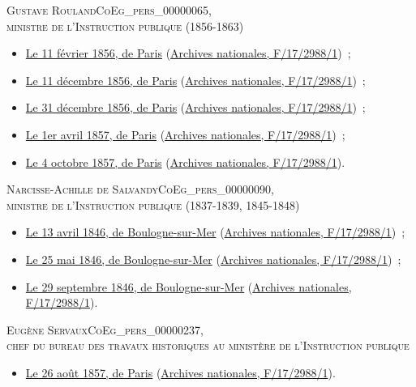 \documentclass{book}
\begin{document}
{\begin{center} \textsc{Gustave Rouland\gls{CoEg_pers_00000065},\\
ministre de l'Instruction publique (1856-1863)}\end{center}
\begin{itemize}
\item \hyperlink{CoEg_Mariette_1856-02-11}{Le 11 février 1856, de Paris} (\hyperlink{CoEg_Mariette_ms_002}{Archives nationales, F/17/2988/1})~;
\item \hyperlink{CoEg_Mariette_1856-12-11}{Le 11 décembre 1856, de Paris} (\hyperlink{CoEg_Mariette_ms_002}{Archives nationales, F/17/2988/1})~;
\item \hyperlink{CoEg_Mariette_1856-12-31}{Le 31 décembre 1856, de Paris} (\hyperlink{CoEg_Mariette_ms_002}{Archives nationales, F/17/2988/1})~;
\item \hyperlink{CoEg_Mariette_1857-04-01}{Le 1er avril 1857, de Paris} (\hyperlink{CoEg_Mariette_ms_002}{Archives nationales, F/17/2988/1})~;
\item \hyperlink{CoEg_Mariette_1857-10-04}{Le 4 octobre 1857, de Paris} (\hyperlink{CoEg_Mariette_ms_002}{Archives nationales, F/17/2988/1}).
\end{itemize}

\begin{center} \textsc{Narcisse-Achille de Salvandy\gls{CoEg_pers_00000090},\\
ministre de l'Instruction publique (1837-1839, 1845-1848)}\end{center}
\begin{itemize}
\item \hyperlink{CoEg_Mariette_1846-04-13}{Le 13 avril 1846, de Boulogne-sur-Mer} (\hyperlink{CoEg_Mariette_ms_002}{Archives nationales, F/17/2988/1})~;
\item \hyperlink{CoEg_Mariette_1846-05-25}{Le 25 mai 1846, de Boulogne-sur-Mer} (\hyperlink{CoEg_Mariette_ms_002}{Archives nationales, F/17/2988/1})~;
\item \hyperlink{CoEg_Mariette_1846-09-29}{Le 29 septembre 1846, de Boulogne-sur-Mer} (\hyperlink{CoEg_Mariette_ms_002}{Archives nationales, F/17/2988/1}).
\end{itemize}

\begin{center} \textsc{Eugène Servaux\gls{CoEg_pers_00000237},\\
chef du bureau des travaux historiques au ministère de l'Instruction publique}\end{center}
\begin{itemize}
\item \hyperlink{CoEg_Mariette_1857-08-26}{Le 26 août 1857, de Paris} (\hyperlink{CoEg_Mariette_ms_002}{Archives nationales, F/17/2988/1}).
\end{itemize}

}
\end{document}
